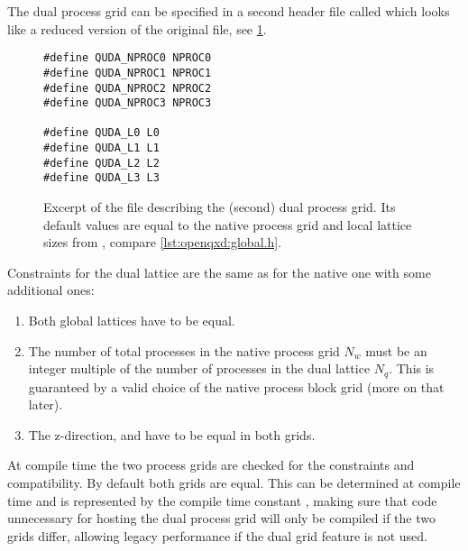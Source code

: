 The dual process grid can be specified in a second header file called  which looks like a reduced version of the original  file, see \cref{lst:interface:quda_global.h}.
\begin{figure}
\begin{codelisting}
\begin{verbatim}
#define QUDA_NPROC0 NPROC0
#define QUDA_NPROC1 NPROC1
#define QUDA_NPROC2 NPROC2
#define QUDA_NPROC3 NPROC3

#define QUDA_L0 L0
#define QUDA_L1 L1
#define QUDA_L2 L2
#define QUDA_L3 L3
\end{verbatim}
\caption{Excerpt of the file  describing the (second) dual process grid. Its default values are equal to the native process grid and local lattice sizes from , compare \cref{lst:openqxd:global.h}.}
\label{lst:interface:quda_global.h}
\end{codelisting}
\end{figure}

Constraints for the dual lattice are the same as for the native one with some additional ones:
\begin{enumerate}
  \item Both global lattices have to be equal.
  \item The number of total processes in the native process grid $N_w$ must be an integer multiple of the number of processes in the dual lattice $N_q$. This is guaranteed by a valid choice of the native process block grid (more on that later).
  \item The z-direction,  and  have to be equal in both grids.
\end{enumerate}
At compile time the two process grids are checked for the constraints and compatibility. By default both grids are equal. This can be determined at compile time and is represented by the compile time constant , making sure that code unnecessary for hosting the dual process grid will only be compiled if the two grids differ, allowing legacy performance if the dual grid feature is not used.

